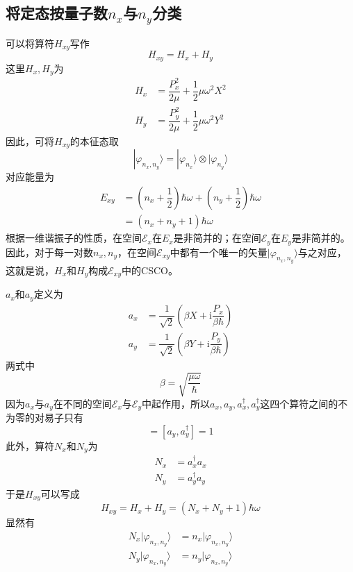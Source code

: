 \documentclass[]{article}
\begin{document}
\subsection{将定态按量子数$n_x$与$n_y$分类}
可以将算符$H_{xy}$写作
\begin{equation}
	H_{xy}=H_x+H_y
\end{equation}
这里$H_x,H_y$为
\begin{align}
	H_x&=\dfrac{P_x^2}{2\mu}+\dfrac{1}{2}\mu\omega^2X^2\nonumber\\
	H_y&=\dfrac{P_y^2}{2\mu}+\dfrac{1}{2}\mu\omega^2Y^2
\end{align}
因此，可将$H_{xy}$的本征态取
\begin{equation}
	|\varphi_{n_x,n_y}\rangle=|\varphi_{n_x}\rangle\otimes|\varphi_{n_y}\rangle
\end{equation}
对应能量为
\begin{align}
	E_{xy}&=\left( n_x+\dfrac{1}{2}\right) \hbar\omega+\left( n_y+\dfrac{1}{2}\right) \hbar\omega\nonumber\\
	&=(n_x+n_y+1)\hbar\omega
	\label{L22}
\end{align}
根据一维谐振子的性质，在空间$\mathscr{E}_x$在$E_x$是非简并的；在空间$\mathscr{E}_y$在$E_y$是非简并的。因此，对于每一对数${n_x,n_y}$，在空间$\mathscr{E}_{xy}$中都有一个唯一的矢量$|\varphi_{n_x,n_y}\rangle$与之对应，这就是说，$H_x$和$H_y$构成$\mathscr{E}_{xy}$中的CSCO。\par 
$a_x$和$a_y$定义为
\begin{align}
	a_x&=\dfrac{1}{\sqrt{2}}\left( \beta X+\mathrm{i}\dfrac{P_x}{\beta\hbar}\right) \nonumber\\
	a_y&=\dfrac{1}{\sqrt{2}}\left( \beta Y+\mathrm{i}\dfrac{P_y}{\beta\hbar}\right) 
\end{align}
两式中
\begin{equation}
	\beta=\sqrt{\dfrac{\mu\omega}{\hbar}}
\end{equation}
因为$a_x$与$a_y$在不同的空间$\mathscr{E}_x$与$\mathscr{E}_y$中起作用，所以$a_x,a_y,a_x^\dagger,a_y^\dagger$这四个算符之间的不为零的对易子只有
\begin{equation}
	[a_x,a_x^\dagger]=[a_y,a_y^\dagger]=1
	\label{L25}
\end{equation}
此外，算符$N_x$和$N_y$为
\begin{align}
	N_x&=a_x^\dagger a_x\nonumber\\
	N_y&=a_y^\dagger a_y
\end{align}
于是$H_{xy}$可以写成
\begin{equation}
	H_{xy}=H_x+H_y=(N_x+N_y+1)\hbar\omega
\end{equation}
显然有
\begin{align}
	N_x|\varphi_{n_x,n_y}\rangle&=n_x|\varphi_{n_x,n_y}\rangle\nonumber\\
	N_y|\varphi_{n_x,n_y}\rangle&=n_y|\varphi_{n_x,n_y}\rangle
\end{align}
\end{document}
